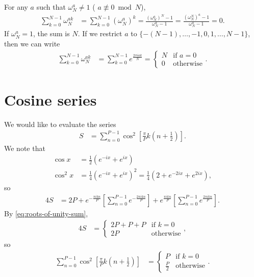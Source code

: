 For any $a$ such that $\omega_N^a \ne 1$ (\ie{} $a \not\equiv 0 \bmod{N}$),
\begin{align}
	\sum_{k=0}^{N-1} \omega_N^{a k}
	&= \sum_{k=0}^{N-1} (\omega_N^a)^k
	= \frac{(\omega_N^a)^N - 1}{\omega_N^a - 1}
	= \frac{(\omega_N^N)^a - 1}{\omega_N^a - 1}
	= 0.
\end{align}
If $\omega_N^a = 1$, the sum is $N$.
If we restrict $a$ to $\{ -(N-1), \ldots, -1, 0, 1, \ldots, N-1 \}$, then we can write
\begin{align}
	\sum_{k=0}^{N-1} \omega_N^{a k}
	&= \sum_{k=0}^{N-1} e^{\frac{2 \pi i a k}{N}}
	= \begin{cases}
			N & \text{if } a = 0 \\
			0 & \text{otherwise}
		\end{cases}.
			\label{eq:roots-of-unity-sum}
\end{align}


\section{Cosine series}

We would like to evaluate the series
\begin{align}
	S
	&= \sum_{n=0}^{P-1} \cos^2{\left[ \frac{\pi}{P} k \left( n + \frac{1}{2} \right) \right]}.
\end{align}
We note that
\begin{subequations}
\begin{align}
	\cos{x}
	&= \frac{1}{2} (e^{-i x} + e^{i x}) \\
	\cos^2{x}
	&= \frac{1}{4} (e^{-i x} + e^{i x})^2
	= \frac{1}{4} (2 + e^{-2 i x} + e^{2 i x}),
\end{align}
\end{subequations}
so
\begin{align}
	4 S
	&= 2 P + e^{-\frac{\pi i k n}{P}} \left[ \sum_{n=0}^{P-1} e^{-\frac{2 \pi i k n}{P}} \right]
		+ e^{\frac{\pi i k n}{P}} \left[ \sum_{n=0}^{P-1} e^{\frac{2 \pi i k n}{P}} \right].
\end{align}
By \cref{eq:roots-of-unity-sum},
\begin{align}
	4 S
	&= \begin{cases}
			2 P + P + P & \text{if } k = 0 \\
			2 P & \text{otherwise}
		\end{cases},
\end{align}
so
\begin{align}
	\sum_{n=0}^{P-1} \cos^2{\left[ \frac{\pi}{P} k \left( n + \frac{1}{2} \right) \right]}
	&= \begin{cases}
			P & \text{if } k = 0 \\
			\frac{P}{2} & \text{otherwise}
		\end{cases}.
			\label{eq:cosine-sum}
\end{align}



